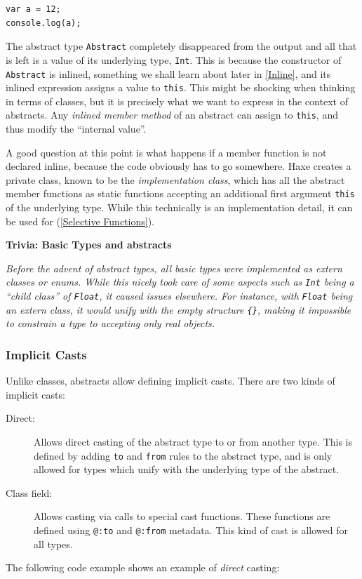 \documentclass{article}
\newcommand{\type}[1]{\texttt{#1}}
\newcommand{\expr}[1]{\texttt{#1}}
\newenvironment{myshaded}
  {\def\FrameCommand{\fboxsep=\topsep\colorbox{bgcolor}}%
  \MakeFramed {\advance\hsize-\width \FrameRestore}}%
 {\endMakeFramed}
\newcommand{\trivia}[2]
	{\begin{myshaded}\noindent\textbf{Trivia: #1}\par\nobreak\noindent\ignorespaces\textit{#2}\end{myshaded}}
\newcommand{\fullref}[1]{\nameref{#1} (\cref{#1})}
\begin{document}
\begin{lstlisting}
var a = 12;
console.log(a);
\end{lstlisting}
The abstract type \type{Abstract} completely disappeared from the output and all that is left is a value of its underlying type, \type{Int}. This is because the constructor of \type{Abstract} is inlined, something we shall learn about later in \cref{Inline}, and its inlined expression assigns a value to \expr{this}. This might be shocking when thinking in terms of classes, but it is precisely what we want to express in the context of abstracts. Any \emph{inlined member method} of an abstract can assign to \expr{this}, and thus modify the ``internal value''.

A good question at this point is what happens if a member function is not declared inline, because the code obviously has to go somewhere. Haxe creates a private class, known to be the \emph{implementation class}, which has all the abstract member functions as static functions accepting an additional first argument \expr{this} of the underlying type. While this technically is an implementation detail, it can be used for \fullref{Selective Functions}.

\trivia{Basic Types and abstracts}{Before the advent of abstract types, all basic types were implemented as extern classes or enums. While this nicely took care of some aspects such as \type{Int} being a ``child class'' of \type{Float}, it caused issues elsewhere. For instance, with \type{Float} being an extern class, it would unify with the empty structure \expr{\{\}}, making it impossible to constrain a type to accepting only real objects.}

\subsubsection{Implicit Casts}
\label{Implicit Casts}

Unlike classes, abstracts allow defining implicit casts. There are two kinds of implicit casts:

\begin{description}
	\item[Direct:] Allows direct casting of the abstract type to or from another type. This is defined by adding \expr{to} and \expr{from} rules to the abstract type, and is only allowed for types which unify with the underlying type of the abstract.
	\item[Class field:] Allows casting via calls to special cast functions. These functions are defined using \expr{@:to} and \expr{@:from} metadata. This kind of cast is allowed for all types.
\end{description}
The following code example shows an example of \emph{direct} casting:
\end{document}
